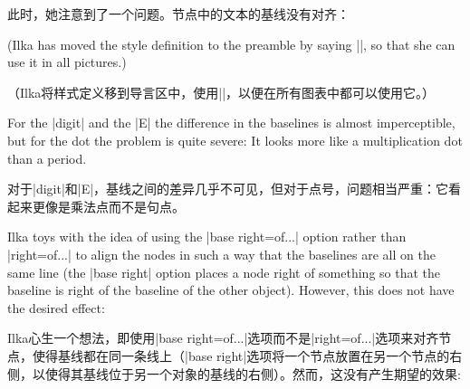 此时，她注意到了一个问题。节点中的文本的基线没有对齐：
%
\begin{codeexample}
\end{codeexample}
%
\begin{codeexample}[preamble={\usetikzlibrary{calc,positioning,shapes.misc}}]
\end{codeexample}
%
\noindent (Ilka has moved the style definition to the preamble by saying
|\tikzset{terminal/.style=...}|, so that she can use it in all pictures.)

\noindent（Ilka将样式定义移到导言区中，使用|\tikzset{terminal/.style=...}|，以便在所有图表中都可以使用它。）

For the |digit| and the |E| the difference in the baselines is almost
imperceptible, but for the dot the problem is quite severe: It looks more like
a multiplication dot than a period.

对于|digit|和|E|，基线之间的差异几乎不可见，但对于点号，问题相当严重：它看起来更像是乘法点而不是句点。

Ilka toys with the idea of using the |base right=of...| option rather than
|right=of...| to align the nodes in such a way that the baselines are all on
the same line (the |base right| option places a node right of something so that
the baseline is right of the baseline of the other object). However, this does
not have the desired effect:

Ilka心生一个想法，即使用|base right=of...|选项而不是|right=of...|选项来对齐节点，使得基线都在同一条线上（|base right|选项将一个节点放置在另一个节点的右侧，以使得其基线位于另一个对象的基线的右侧）。然而，这没有产生期望的效果:

%
\begin{codeexample}[preamble={\usetikzlibrary{positioning,shapes.misc}}]
\end{codeexample}
%

